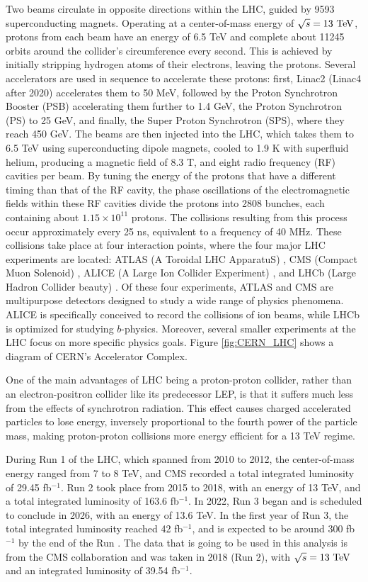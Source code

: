 Two beams circulate in opposite directions within the LHC, guided by 9593 superconducting magnets. Operating at a center-of-mass energy of $\sqrt{s} = 13\ \text{TeV}$, protons from each beam have an energy of 6.5 TeV and complete about 11245 orbits around the collider's circumference every second. This is achieved by initially stripping hydrogen atoms of their electrons, leaving the protons. Several accelerators are used in sequence to accelerate these protons: first, Linac2 (Linac4 after 2020) accelerates them to 50 MeV, followed by the Proton Synchrotron Booster (PSB) accelerating them further to 1.4 GeV, the Proton Synchrotron (PS) to 25 GeV, and finally, the Super Proton Synchrotron (SPS), where they reach 450 GeV. The beams are then injected into the LHC, which takes them to 6.5 TeV using superconducting dipole magnets, cooled to 1.9 K with superfluid helium, producing a magnetic field of 8.3 T, and eight radio frequency (RF) cavities per beam. By tuning the energy of the protons that have a different timing than that of the RF cavity, the phase oscillations of the electromagnetic fields within these RF cavities divide the protons into 2808 bunches, each containing about $1.15\times10^{11}$ protons. The collisions resulting from this process occur approximately every 25 ns, equivalent to a frequency of 40 MHz. These collisions take place at four interaction points, where the four major LHC experiments are located: ATLAS (A Toroidal LHC ApparatuS) \cite{ATLAS:1994vge}, CMS (Compact Muon Solenoid) \cite{CMS:1994hea}, ALICE (A Large Ion Collider Experiment) \cite{413235}, and LHCb (Large Hadron Collider beauty) \cite{LHCb:1998kcv}. Of these four experiments, ATLAS and CMS are multipurpose detectors designed to study a wide range of physics phenomena. ALICE is specifically conceived to record the collisions of ion beams, while LHCb is optimized for studying $b$-physics. Moreover, several smaller experiments at the LHC focus on more specific physics goals. Figure \ref{fig:CERN_LHC} shows a diagram of CERN's Accelerator Complex.

One of the main advantages of LHC being a proton-proton collider, rather than an electron-positron collider like its predecessor LEP, is that it suffers much less from the effects of synchrotron radiation. This effect causes charged accelerated particles to lose energy, inversely proportional to the fourth power of the particle mass, making proton-proton collisions more energy efficient for a 13 TeV regime.

During Run 1 of the LHC, which spanned from 2010 to 2012, the center-of-mass energy ranged from 7 to 8 TeV, and CMS recorded a total integrated luminosity of 29.45 fb$^{-1}$. Run 2 took place from 2015 to 2018, with an energy of 13 TeV, and a total integrated luminosity of 163.6 fb$^{-1}$. In 2022, Run 3 began and is scheduled to conclude in 2026, with an energy of 13.6 TeV. In the first year of Run 3, the total integrated luminosity reached 42 fb$^{-1}$, and is expected to be around 300 fb$^{-1}$ by the end of the Run \cite{CMS:luminosity}. The data that is going to be used in this analysis is from the CMS collaboration and was taken in 2018 (Run 2), with $\sqrt{s} = 13\ \text{TeV}$ and an integrated luminosity of 39.54 fb$^{-1}$.

